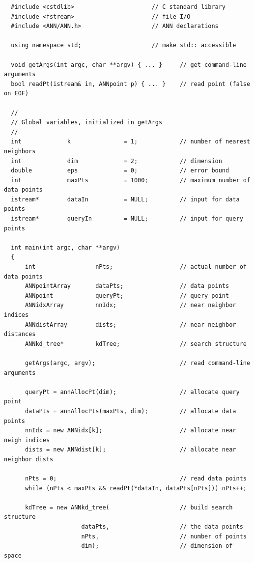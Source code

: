 \documentclass[11pt]{article}		%
\begin{document}
{\small \begin{verbatim}
  #include <cstdlib>                      // C standard library
  #include <fstream>                      // file I/O
  #include <ANN/ANN.h>                    // ANN declarations
  
  using namespace std;                    // make std:: accessible
  
  void getArgs(int argc, char **argv) { ... }     // get command-line arguments
  bool readPt(istream& in, ANNpoint p) { ... }    // read point (false on EOF)

  //
  // Global variables, initialized in getArgs
  //
  int             k               = 1;            // number of nearest neighbors
  int             dim             = 2;            // dimension
  double          eps             = 0;            // error bound
  int             maxPts          = 1000;         // maximum number of data points
  istream*        dataIn          = NULL;         // input for data points
  istream*        queryIn         = NULL;         // input for query points
  
  int main(int argc, char **argv)
  {
      int                 nPts;                   // actual number of data points
      ANNpointArray       dataPts;                // data points
      ANNpoint            queryPt;                // query point
      ANNidxArray         nnIdx;                  // near neighbor indices
      ANNdistArray        dists;                  // near neighbor distances
      ANNkd_tree*         kdTree;                 // search structure
  
      getArgs(argc, argv);                        // read command-line arguments
  
      queryPt = annAllocPt(dim);                  // allocate query point
      dataPts = annAllocPts(maxPts, dim);         // allocate data points
      nnIdx = new ANNidx[k];                      // allocate near neigh indices
      dists = new ANNdist[k];                     // allocate near neighbor dists
  
      nPts = 0;                                   // read data points
      while (nPts < maxPts && readPt(*dataIn, dataPts[nPts])) nPts++;
  
      kdTree = new ANNkd_tree(                    // build search structure
                      dataPts,                    // the data points
                      nPts,                       // number of points
                      dim);                       // dimension of space
  

\end{verbatim}}
\end{document}
